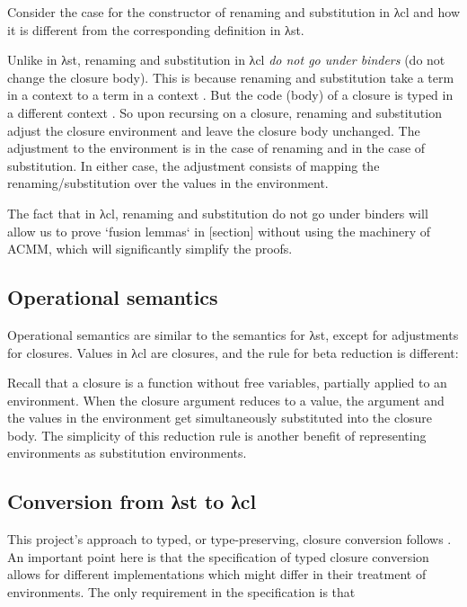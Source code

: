 \documentclass[bsc,frontabs,twoside,singlespacing,parskip,deptreport]{infthesis}
\theoremstyle{definition}
\begin{document}
Consider the case for the constructor  of renaming and
substitution in λcl and how it is different from the corresponding
definition in λst.


Unlike in λst, renaming and substitution in λcl \textit{do not go
  under binders} (do not change the closure body). This is because
renaming and substitution take a term in a context  to a term in
a context . But the code (body) of a closure is typed in a
different context . So upon recursing on a closure, renaming and
substitution adjust the closure environment and leave the closure body
unchanged. The adjustment to the environment is 
in the case of renaming and  in the case of
substitution. In either case, the adjustment consists of mapping the
renaming/substitution over the values in the environment.

The fact that in λcl, renaming and substitution do not go under
binders will allow us to prove `fusion lemmas` in [section] without
using the machinery of ACMM, which will significantly simplify the
proofs.

\subsection{Operational semantics}
\label{sec:oper-semant}

Operational semantics are similar to the semantics for λst, except for
adjustments for closures. Values in λcl are closures, and the rule for
beta reduction is different:


Recall that a closure is a function without free variables,
partially applied to an environment. When the closure argument reduces
to a value, the argument and the values in the environment get
simultaneously substituted into the closure body. The simplicity of
this reduction rule is another benefit of representing environments as
substitution environments.

\subsection{Conversion from λst to λcl}
\label{sec:conversion-from-st}

This project's approach to typed, or type-preserving, closure
conversion follows \cite{DBLP:conf/popl/MinamideMH96}. An important
point here is that the specification of typed closure conversion
allows for different implementations which might differ in their
treatment of environments. The only requirement in the specification
is that
\end{document}
